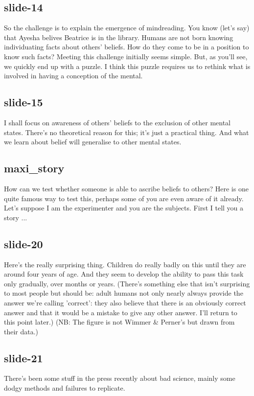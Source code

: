 \documentclass[12pt,\papersize]{extarticle}
\begin{document}
 
\subsection{slide-14}
So the challenge is to explain the emergence of mindreading.
You know (let's say) that Ayesha belives Beatrice is in the library.
Humans are not born knowing individuating facts about others' beliefs.
How do they come to be in a position to know such facts?
Meeting this challenge initially seems simple.
But, as you'll see, we quickly end up with a puzzle.
I think this puzzle requires us to rethink what is involved in having a conception of the mental.
 
 
\subsection{slide-15}
I shall focus on awareness of others' beliefs to the exclusion of other mental states.
There's no theoretical reason for this; it's just a practical thing.
And what we learn about belief will generalise to other mental states.
 
 
\subsection{maxi\_story}
How can we test whether someone is able to ascribe beliefs to others?
Here is one quite famous way to test this, perhaps some of you are even aware of it already.
Let's suppose I am the experimenter and you are the subjects.
First I tell you a story ...
 
 
\subsection{slide-20}
Here's the really surprising thing.
Children do really badly on this until they are around four years of age.
And they seem to develop the ability to pass this task only gradually, over months or years.
(There's something else that isn't surprising to most people but should be: adult humans not only nearly always provide the answer we're calling 'correct': they also believe that there is an obviously correct answer and that it would be a mistake to give any other answer. I'll return to this point later.)
(NB: The figure is not Wimmer \& Perner's but drawn from their data.)
 
 
\subsection{slide-21}
There's been some stuff in the press recently about bad science, mainly some dodgy methods and failures to replicate.
 
\end{document}

